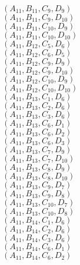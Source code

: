 \documentclass[14pt]{article}
\begin{document}
    $({A}_{11}, {B}_{11}, {C}_{9}, {D}_{9}) $ \\ 
    $({A}_{11}, {B}_{11}, {C}_{9}, {D}_{10}) $ \\ 
    $({A}_{11}, {B}_{11}, {C}_{10}, {D}_{9}) $ \\ 
    $({A}_{11}, {B}_{11}, {C}_{10}, {D}_{10}) $ \\ 
    $({A}_{11}, {B}_{12}, {C}_{5}, {D}_{6}) $ \\ 
    $({A}_{11}, {B}_{12}, {C}_{6}, {D}_{5}) $ \\ 
    $({A}_{11}, {B}_{12}, {C}_{9}, {D}_{9}) $ \\ 
    $({A}_{11}, {B}_{12}, {C}_{9}, {D}_{10}) $ \\ 
    $({A}_{11}, {B}_{12}, {C}_{10}, {D}_{9}) $ \\ 
    $({A}_{11}, {B}_{12}, {C}_{10}, {D}_{10}) $ \\ 
    $({A}_{11}, {B}_{13}, {C}_{1}, {D}_{6}) $ \\ 
    $({A}_{11}, {B}_{13}, {C}_{2}, {D}_{6}) $ \\ 
    $({A}_{11}, {B}_{13}, {C}_{3}, {D}_{6}) $ \\ 
    $({A}_{11}, {B}_{13}, {C}_{6}, {D}_{1}) $ \\ 
    $({A}_{11}, {B}_{13}, {C}_{6}, {D}_{2}) $ \\ 
    $({A}_{11}, {B}_{13}, {C}_{6}, {D}_{3}) $ \\ 
    $({A}_{11}, {B}_{13}, {C}_{7}, {D}_{9}) $ \\ 
    $({A}_{11}, {B}_{13}, {C}_{7}, {D}_{10}) $ \\ 
    $({A}_{11}, {B}_{13}, {C}_{8}, {D}_{9}) $ \\ 
    $({A}_{11}, {B}_{13}, {C}_{8}, {D}_{10}) $ \\ 
    $({A}_{11}, {B}_{13}, {C}_{9}, {D}_{7}) $ \\ 
    $({A}_{11}, {B}_{13}, {C}_{9}, {D}_{8}) $ \\ 
    $({A}_{11}, {B}_{13}, {C}_{10}, {D}_{7}) $ \\ 
    $({A}_{11}, {B}_{13}, {C}_{10}, {D}_{8}) $ \\ 
    $({A}_{11}, {B}_{14}, {C}_{1}, {D}_{6}) $ \\ 
    $({A}_{11}, {B}_{14}, {C}_{2}, {D}_{6}) $ \\ 
    $({A}_{11}, {B}_{14}, {C}_{3}, {D}_{6}) $ \\ 
    $({A}_{11}, {B}_{14}, {C}_{6}, {D}_{1}) $ \\ 
    $({A}_{11}, {B}_{14}, {C}_{6}, {D}_{2}) $ \\ 
\end{document}
